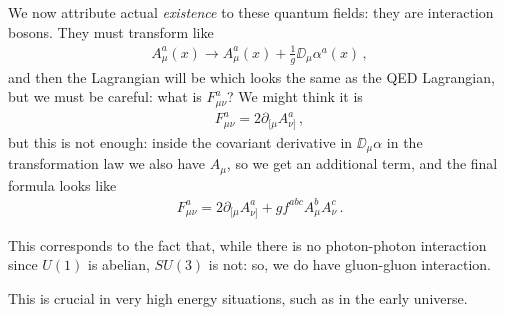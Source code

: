 \documentclass[main.tex]{subfiles}
\begin{document}
We now attribute actual \emph{existence} to these quantum fields: they are interaction bosons. 
They must transform like 
%
\begin{align}
A^{a}_{\mu }(x) \to A^{a}_{\mu } (x) + \frac{1}{g} \DD_{\mu } \alpha^{a}(x)
\,,
\end{align}
%
and then the Lagrangian will be 
%
%
which looks the same as the QED Lagrangian, but we must be careful: what is \(F_{\mu \nu }^{a}\)? We might think it is 
%
\begin{align}
F^{a}_{\mu \nu } = 2 \partial_{[\mu } A^{a}_{\nu ]}
\,,
\end{align}
%
but this is not enough: inside the covariant derivative in \(\DD_{\mu } \alpha \) in the transformation law we also have \(A_{\mu }\), so we get an additional term, and the final formula looks like 
%
\begin{align}
F^{a}_{\mu \nu } = 2 \partial_{[\mu } A^{a}_{\nu ]} + g f^{abc} A^{b}_{\mu } A^{c}_{\nu }
\,.
\end{align}

This corresponds to the fact that, while there is no photon-photon interaction since \(U(1)\) is abelian,  \(SU(3)\) is not: so, we do have gluon-gluon interaction. 

This is crucial in very high energy situations, such as in the early universe. 
\end{document}
